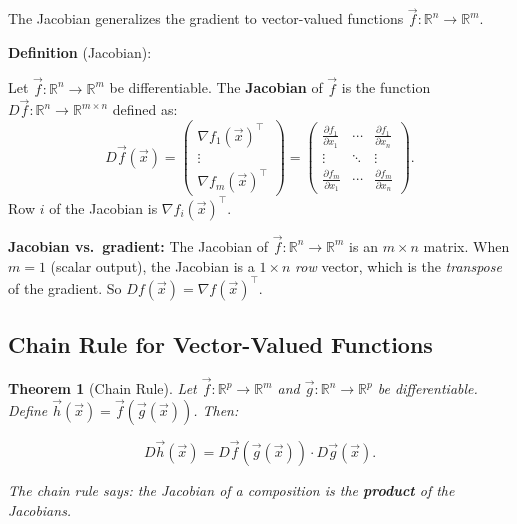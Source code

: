 \documentclass[10pt, twocolumn]{article}
\theoremstyle{definition}
\theoremstyle{plain}
\newtheorem{theorem}{Theorem}
\newcommand{\RR}{\mathbb{R}}
\begin{document}
The Jacobian generalizes the gradient to vector-valued functions $\vec{f}: \RR^n \to \RR^m$.

\begin{tcolorbox}
\textbf{Definition} (Jacobian):

Let $\vec{f}: \RR^n \to \RR^m$ be differentiable. The \textbf{Jacobian} of $\vec{f}$ is the function $D\vec{f}: \RR^n \to \RR^{m \times n}$ defined as:
\[
    D\vec{f}(\vec{x}) = \begin{pmatrix} \nabla f_1(\vec{x})^\top \\ \vdots \\ \nabla f_m(\vec{x})^\top \end{pmatrix} = \begin{pmatrix} \frac{\partial f_1}{\partial x_1} & \!\cdots\! & \frac{\partial f_1}{\partial x_n} \\ \vdots & \!\ddots\! & \vdots \\ \frac{\partial f_m}{\partial x_1} & \!\cdots\! & \frac{\partial f_m}{\partial x_n} \end{pmatrix}.
\]
Row $i$ of the Jacobian is $\nabla f_i(\vec{x})^\top$.
\end{tcolorbox}

\begin{tcolorbox}[colframe=black!50]
\textbf{Jacobian vs.\ gradient:} The Jacobian of $\vec{f}: \RR^n \to \RR^m$ is an $m \times n$ matrix. When $m = 1$ (scalar output), the Jacobian is a $1 \times n$ \emph{row} vector, which is the \emph{transpose} of the gradient. So $Df(\vec{x}) = \nabla f(\vec{x})^\top$.
\end{tcolorbox}

\subsection{Chain Rule for Vector-Valued Functions}

\begin{theorem}[Chain Rule]
Let $\vec{f}: \RR^p \to \RR^m$ and $\vec{g}: \RR^n \to \RR^p$ be differentiable. Define $\vec{h}(\vec{x}) = \vec{f}(\vec{g}(\vec{x}))$. Then:
\begin{result}
\[
    D\vec{h}(\vec{x}) = D\vec{f}(\vec{g}(\vec{x})) \cdot D\vec{g}(\vec{x}).
\]
\end{result}
The chain rule says: the Jacobian of a composition is the \textbf{product} of the Jacobians.
\end{theorem}
\end{document}
